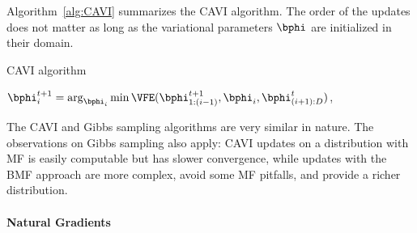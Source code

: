 Algorithm~\ref{alg:CAVI} summarizes the \ac{CAVI} algorithm.
The order of the updates does not matter as long as the variational parameters $\bphi$ are initialized in their domain.

\begin{algorithm}
    \caption{\ac{CAVI} algorithm}
    \label{alg:CAVI}
    \begin{algorithmic}
                \State $\bphi_i^{t+1} = \arg_{\bphi_i}\min \VFE(\bphi^{t+1}_{1:(i-1)},\bphi_i, \bphi^t_{(i+1):D})$,
            \EndFor
        \EndWhile
    \end{algorithmic}
\end{algorithm}

The \ac{CAVI} and Gibbs sampling algorithms are very similar in nature.
The observations on Gibbs sampling also apply: \ac{CAVI} updates on a distribution with \ac{MF} is easily computable but has slower convergence, while updates with the \ac{BMF} approach are more complex, avoid some \ac{MF} pitfalls, and provide a richer distribution.

\paragraph{Natural Gradients}

